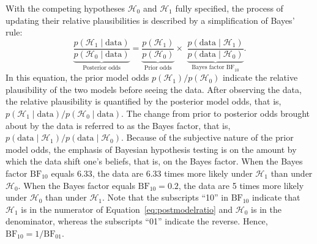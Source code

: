 With the competing hypotheses $\mathcal{H}_0$ and $\mathcal{H}_1$ fully specified, the process of updating their relative plausibilities is described by a simplification of Bayes' rule:
\begin{equation}
\underbrace{\frac{p(\mathcal{H}_1 \mid \text{data})}{p(\mathcal{H}_0 \mid
\text{data})}}_{\text{Posterior
odds}}=\underbrace{\frac{p(\mathcal{H}_1)}{p(\mathcal{H}_0)}}_{\text{Prior
odds}} \times \,\,
\underbrace{\frac{p(\text{data} \mid \mathcal{H}_1)}{p(\text{data} \mid
\mathcal{H}_0)}}_{\text{Bayes factor BF}_{10}}.
\label{eq:postmodelratio}
\end{equation}
In this equation, the prior model odds $p(\mathcal{H}_1)/p(\mathcal{H}_0)$ indicate the relative plausibility of the two models before seeing the data. After observing the data, the relative plausibility is quantified by the posterior model odds, that is, $p(\mathcal{H}_1 \mid \text{data}) / p(\mathcal{H}_0 \mid \text{data})$. The change from prior to posterior odds brought about by the data is referred to as the Bayes factor, that is, $p(\text{data} \mid \mathcal{H}_1) / p(\text{data} \mid \mathcal{H}_0)$. Because of the subjective nature of the prior model odds, the emphasis of Bayesian hypothesis testing is on the amount by which the data shift one's beliefs, that is, on the Bayes factor. When the Bayes factor $\text{BF}_{10}$ equals $6.33$, the data are $6.33$ times more likely under $\mathcal{H}_1$ than under $\mathcal{H}_0$. When the Bayes factor equals $\text{BF}_{10} = 0.2$, the data are 5 times more likely under $\mathcal{H}_0$ than under $\mathcal{H}_1$. Note that the subscripts ``10'' in $\text{BF}_{10}$ indicate that $\mathcal{H}_1$ is in the numerator of Equation~\ref{eq:postmodelratio} and $\mathcal{H}_0$ is in the denominator, whereas the subscripts ``01'' indicate the reverse. Hence, $\text{BF}_{10} = 1/\text{BF}_{01}$.

